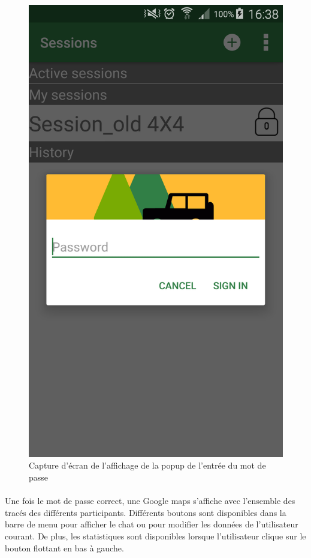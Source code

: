 \documentclass[titlepage, 12pt]{report}
\begin{document}
\begin{figure}[!h]
	\caption{Capture d'écran de l'affichage de la popup de l'entrée du mot de passe}
	\label{screenshots_password}
	\centering
	\includegraphics[scale=0.2]{Images/screenshots/password.png}
\end{figure}

\clearpage

\paragraph{}Une fois le mot de passe correct, une Google maps s'affiche avec l'ensemble des tracés des différents participants. Différents boutons sont disponibles dans la barre de menu pour afficher le chat ou pour modifier les données de l'utilisateur courant. De plus, les statistiques sont disponibles lorsque l'utilisateur clique sur le bouton flottant en bas à gauche.
\end{document}
